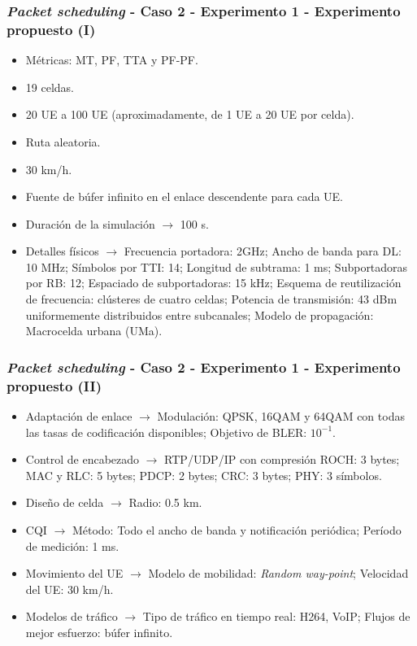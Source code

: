 \documentclass{beamer}
\begin{document}
\begin{frame}
\frametitle{\textit{Packet scheduling} - Caso 2 - Experimento 1 - Experimento propuesto (I)}

\begin{itemize}
\item Métricas: MT, PF, TTA y PF-PF.
\item 19 celdas.
\item 20 UE a 100 UE (aproximadamente, de 1 UE a 20 UE por celda).
\item Ruta aleatoria.
\item 30 km/h.
\item Fuente de búfer infinito en el enlace descendente para cada UE.
\item
Duración de la simulación $\rightarrow$ 100 s.
\item
Detalles físicos $\rightarrow$
Frecuencia portadora: 2GHz;
Ancho de banda para DL: 10 MHz;
Símbolos por TTI: 14;
Longitud de subtrama: 1 ms;
Subportadoras por RB: 12;
Espaciado de subportadoras: 15 kHz;
Esquema de reutilización de frecuencia: clústeres de cuatro celdas;
Potencia de transmisión: 43 dBm uniformemente distribuidos entre subcanales;
Modelo de propagación: Macrocelda urbana (UMa).
\end{itemize}
\end{frame}

\begin{frame}
\frametitle{\textit{Packet scheduling} - Caso 2 - Experimento 1 - Experimento propuesto (II)}

\begin{itemize}
\item
Adaptación de enlace $\rightarrow$
Modulación: QPSK, 16QAM y 64QAM con todas las tasas de codificación disponibles;
Objetivo de BLER: $10^{-1}$.
\item
Control de encabezado $\rightarrow$
RTP/UDP/IP con compresión ROCH: 3 bytes;
MAC y RLC: 5 bytes;
PDCP: 2 bytes;
CRC: 3 bytes;
PHY: 3 símbolos.
\item
Diseño de celda $\rightarrow$
Radio: 0.5 km.
\item
CQI $\rightarrow$
Método: Todo el ancho de banda y notificación periódica;
Período de medición: 1 ms.
\item
Movimiento del UE $\rightarrow$
Modelo de mobilidad: \textit{Random way-point};
Velocidad del UE: 30 km/h.
\item
Modelos de tráfico $\rightarrow$
Tipo de tráfico en tiempo real: H264, VoIP;
Flujos de mejor esfuerzo: búfer infinito.
\end{itemize}
\end{frame}
\end{document}
